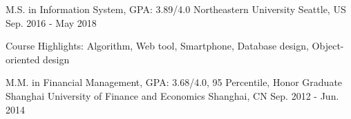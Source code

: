 

\begin{cventries}

  \cventry
    {M.S. in Information System, GPA: 3.89/4.0} %
    {Northeastern University} %
    {Seattle, US} %
    {Sep. 2016 - May 2018} %
    {
      \begin{cvitems} %
        \item {Course Highlights: Algorithm, Web tool, Smartphone, Database design, Object-oriented design}
      \end{cvitems}
    }


  \cventry
    {M.M. in Financial Management, GPA: 3.68/4.0, 95 Percentile, Honor Graduate} %
    {Shanghai University of Finance and Economics} %
    {Shanghai, CN} %
    {Sep. 2012 - Jun. 2014} %
    {}
  \vspace{-8mm}

\end{cventries}
